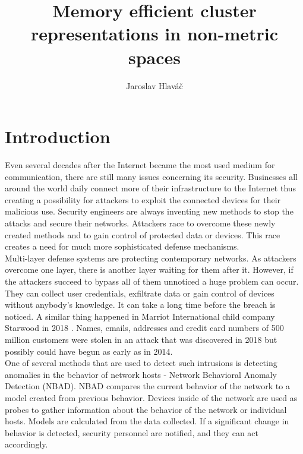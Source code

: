 \documentclass[thesis=B,english]{FITthesis}[2012/10/20]
\title{ Memory efficient cluster representations in non-metric spaces}
\author{Jaroslav Hlaváč} %
\begin{document}

\chapter{Introduction}

Even several decades after the Internet became the most used medium for communication, there are still many issues concerning its security.
Businesses all around the world daily connect more of their infrastructure to the Internet thus creating a possibility for attackers to exploit the connected devices for their malicious use.
Security engineers are always inventing new methods to stop the attacks and secure their networks.
Attackers race to overcome these newly created methods and to gain control of protected data or devices.
This race creates a need for much more sophisticated defense mechanisms. \\

Multi-layer defense systems are protecting contemporary networks.
As attackers overcome one layer, there is another layer waiting for them after it.
However, if the attackers succeed to bypass all of them unnoticed a huge problem can occur.
They can collect user credentials,  exfiltrate data or gain control of devices without anybody's knowledge.
It can take a long time before the breach is noticed.
A similar thing happened in Marriot International child company Starwood in 2018 \cite{hron2018breaches}.
Names, emails, addresses and credit card numbers of 500 million customers were stolen in an attack that was discovered in 2018 but possibly could have begun as early as in 2014. \\
                                                                                                                                                                    
One of several methods that are used to detect such intrusions is detecting anomalies in the behavior of network hosts - Network Behavioral Anomaly Detection (NBAD).
NBAD compares the current behavior of the network to a model created from previous behavior.
Devices inside of the network are used as probes to gather information about the behavior of the network or individual hosts.
Models are calculated from the data collected.
If a significant change in behavior is detected, security personnel are notified, and they can act accordingly. \\
                                                                                  
\end{document}
